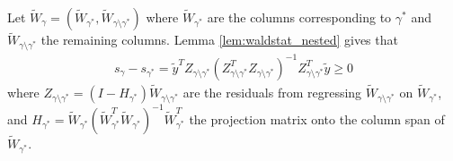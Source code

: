 Let $\widetilde{W}_\gamma= (\widetilde{W}_{\gamma^*}, \widetilde{W}_{\gamma \setminus \gamma^*})$ where $\widetilde{W}_{\gamma^*}$ are the columns corresponding to $\gamma^*$ and $\widetilde{W}_{\gamma \setminus \gamma^*}$ the remaining columns.
Lemma \ref{lem:waldstat_nested} gives that
\begin{align}
 s_\gamma - s_{\gamma^*}= \tilde{y}^T Z_{\gamma \setminus \gamma^*} (Z_{\gamma \setminus \gamma^*}^T Z_{\gamma \setminus \gamma^*})^{-1} Z_{\gamma \setminus \gamma^*}^T \tilde{y} \geq 0
\nonumber
\end{align}
where $Z_{\gamma \setminus \gamma^*}= (I - H_{\gamma^*}) \widetilde{W}_{\gamma \setminus \gamma^*}$ are the residuals from regressing $\widetilde{W}_{\gamma \setminus \gamma^*}$ on $\widetilde{W}_{\gamma^*}$, and $H_{\gamma^*}= \widetilde{W}_{\gamma^*} (\widetilde{W}_{\gamma^*}^T \widetilde{W}_{\gamma^*})^{-1} \widetilde{W}_{\gamma^*}^T$ the projection matrix onto the column span of $\widetilde{W}_{\gamma^*}$.

